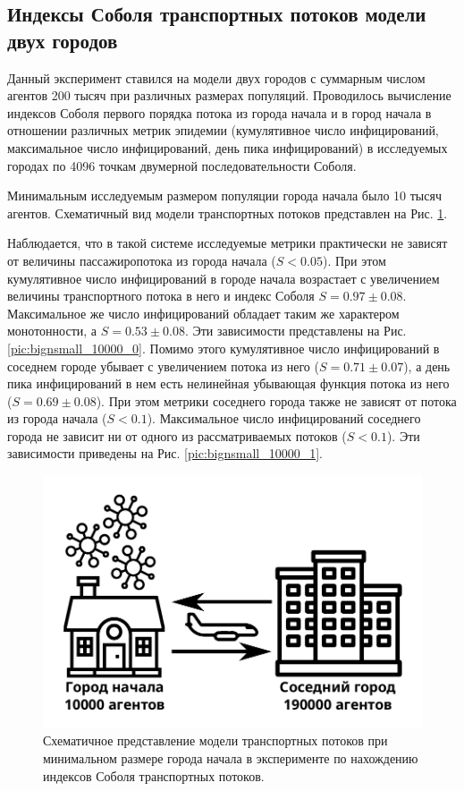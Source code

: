 \documentclass[a4paper,12pt]{article} %
\begin{document}
\newpage
\subsection{Индексы Соболя транспортных потоков модели двух городов}
Данный эксперимент ставился на модели двух городов с суммарным числом агентов 200 тысяч при различных размерах популяций. Проводилось вычисление индексов Соболя первого порядка потока из города начала и в город начала в отношении различных метрик эпидемии (кумулятивное число инфицирований, максимальное число инфицирований, день пика инфицирований) в исследуемых городах по 4096 точкам двумерной последовательности Соболя.

Минимальным исследуемым размером популяции города начала было 10 тысяч агентов. Схематичный вид модели транспортных потоков представлен на Рис. \ref{pic:bignsmall_small_start}. 

Наблюдается, что в такой системе исследуемые метрики практически не зависят от величины пассажиропотока из города начала ($S < 0.05$). При этом кумулятивное число инфицирований в городе начала возрастает с увеличением величины транспортного потока в него и индекс Соболя $S = 0.97\pm 0.08$. Максимальное же число инфицирований обладает таким же характером монотонности, а $S = 0.53\pm 0.08$. Эти зависимости представлены на Рис. \ref{pic:bignsmall_10000_0}. Помимо этого кумулятивное число инфицирований в соседнем городе убывает с увеличением потока из него ($S = 0.71\pm 0.07$), а день пика инфицирований в нем есть нелинейная убывающая функция потока из него ($S = 0.69\pm 0.08$). При этом метрики соседнего города также не зависят от потока из города начала ($S < 0.1$). Максимальное число инфицирований соседнего города не зависит ни от одного из рассматриваемых потоков ($S < 0.1$). Эти зависимости приведены на Рис. \ref{pic:bignsmall_10000_1}.

\begin{figure}[H]
    \centering
    \includegraphics[width=0.5\linewidth]{images/bignsmall_small_start.pdf}
    \caption{Схематичное представление модели транспортных потоков при минимальном размере города начала в эксперименте по нахождению индексов Соболя транспортных потоков.}
    \label{pic:bignsmall_small_start}
\end{figure}
\end{document}
